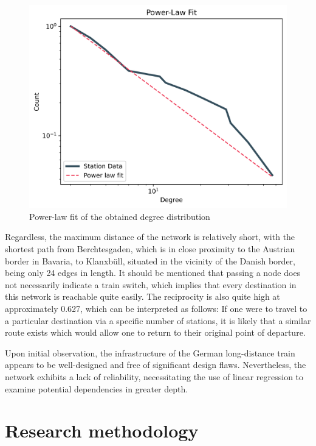 \documentclass[12pt,a4paper]{article}
\begin{document}
\begin{figure}[!h]
  \includegraphics[clip=true,width=\columnwidth]{../data/visualizations/powerlaw_fit.png}
  \caption{Power-law fit of the obtained degree distribution}
   \label{fig:network-powerlaw}
\end{figure}

Regardless, the maximum distance of the network is relatively short, with the shortest path from Berchtesgaden, which is in close proximity to the Austrian border in Bavaria, to Klanxbüll, situated in the vicinity of the Danish border, being only 24 edges in length. 
It should be mentioned that passing a node does not necessarily indicate a train switch, which implies that every destination in this network is reachable quite easily. The reciprocity is also quite high at approximately 0.627, which can be interpreted as follows: If one were to travel to a particular destination via a specific number of stations, it is likely that a similar route exists which would allow one to return to their original point of departure. 

Upon initial observation, the infrastructure of the German long-distance train appears to be well-designed and free of significant design flaws. Nevertheless, the network exhibits a lack of reliability, necessitating the use of linear regression to examine potential dependencies in greater depth.
\maketitle
\section{\label{sec:Research methodology}Research methodology}
\end{document}
